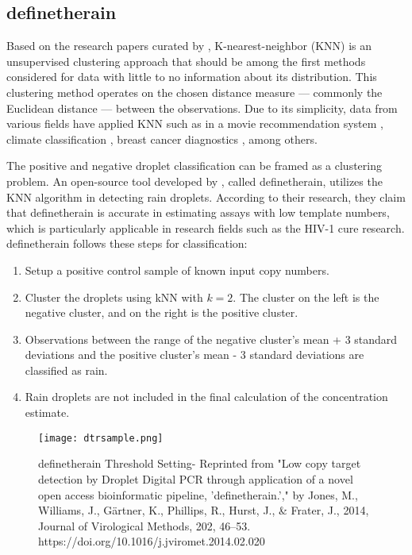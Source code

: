 \subsection{definetherain}
\label{sec:knn}
Based on the research papers curated by , K-nearest-neighbor (KNN) is an unsupervised clustering approach that should be among the first methods considered for data with little to no information about its distribution. This clustering method operates on the chosen distance measure — commonly the Euclidean distance — between the observations. Due to its simplicity, data from various fields have applied KNN such as in a movie recommendation system \cite{Ahuja2019}, climate classification \cite{Shi2020}, breast cancer diagnostics \cite{Mittal2019}, among others.

The positive and negative droplet classification can be framed as a clustering problem. An open-source tool developed by , called definetherain, utilizes the KNN algorithm in detecting rain droplets. According to their research, they claim that definetherain is accurate in estimating assays with low template numbers, which is particularly applicable in research fields such as the HIV-1 cure research. definetherain follows these steps for classification:
\begin{enumerate}
    \item Setup a positive control sample of known input copy numbers. 
    \item Cluster the droplets using kNN with \(k=2\). The cluster on the left is the negative cluster, and on the right is the positive cluster. 
    \item Observations between the range of the negative cluster's mean + 3 standard deviations and the positive cluster's mean - 3 standard deviations are classified as rain.
    \item Rain droplets are not included in the final calculation of the concentration estimate.
\end{enumerate}

\begin{figure}[h]
    \centering
    \texttt{[image: dtrsample.png]}
    \caption[definetherain Threshold Setting]{definetherain Threshold Setting- Reprinted from "Low copy target detection by Droplet Digital PCR through application of a novel open access bioinformatic pipeline, 'definetherain.'," by Jones, M., Williams, J., Gärtner, K., Phillips, R., Hurst, J., \& Frater, J., 2014, Journal of Virological Methods, 202, 46–53. https://doi.org/10.1016/j.jviromet.2014.02.020}
    \label{fig:dtrsample}
\end{figure}

